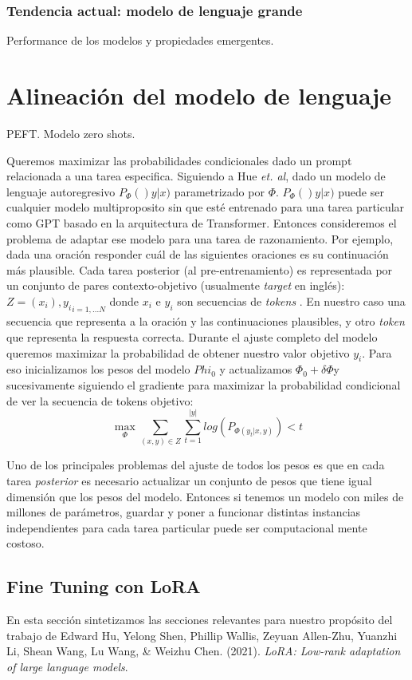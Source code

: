 \documentclass[11pt,a4paper,twoside]{tesis}
\begin{document}
\subsection{Tendencia actual: modelo de lenguaje grande}
Performance de los modelos y propiedades emergentes. 


\chapter{Alineación del modelo de lenguaje} 
PEFT. Modelo zero shots. 

Queremos maximizar las probabilidades condicionales dado un prompt relacionada a una tarea especifica. Siguiendo a Hue \textit{et. al}, dado un modelo de lenguaje autoregresivo $P_{\Phi}()y|x)$ parametrizado por $\Phi$. $P_{\Phi}()y|x)$ puede ser cualquier modelo multiproposito sin que esté entrenado para una tarea particular como GPT basado en la arquitectura de Transformer. Entonces consideremos el problema de adaptar ese modelo para una tarea de razonamiento. Por ejemplo, dada una oración responder cuál de las siguientes oraciones es su continuación más plausible. Cada tarea posterior (al pre-entrenamiento) es representada por un conjunto de pares contexto-objetivo (usualmente \textit{target} en inglés): $Z={(x_i),y_i}_{i=1,...N}$ donde $x_i$ e $y_i$ son secuencias de \textit{tokens} \cite{hu2021lora}. En nuestro caso una secuencia que representa a la oración y las continuaciones plausibles, y otro \textit{token} que representa la respuesta correcta.
Durante el ajuste completo del modelo queremos maximizar la probabilidad de obtener nuestro valor objetivo $y_i$. Para eso inicializamos los pesos del modelo $Phi_{0}$ y actualizamos $\Phi_0 + \delta\Phi$y sucesivamente siguiendo el gradiente para maximizar la probabilidad condicional de ver la secuencia de tokens objetivo:
$$\max_{\Phi} \sum_{(x,y)\in Z} \sum_{t=1}^{|y|} log (P_{\Phi(y_t|x,y)})<t$$

Uno de los principales problemas del ajuste de todos los pesos es que en cada tarea \textit{posterior} es necesario actualizar un conjunto de pesos que tiene igual dimensión que los pesos del modelo. Entonces si tenemos un modelo con miles de millones de parámetros, guardar y poner a funcionar distintas instancias independientes para cada tarea particular puede ser computacional mente costoso. \cite{hu2021lora}

\section{Fine Tuning con LoRA} 
En esta sección sintetizamos las secciones relevantes para nuestro propósito del trabajo de Edward Hu, Yelong Shen, Phillip Wallis, Zeyuan Allen-Zhu, Yuanzhi Li, Shean Wang, Lu Wang, \& Weizhu Chen. (2021). \textit{LoRA: Low-rank adaptation of large language models}.\\
\end{document}
